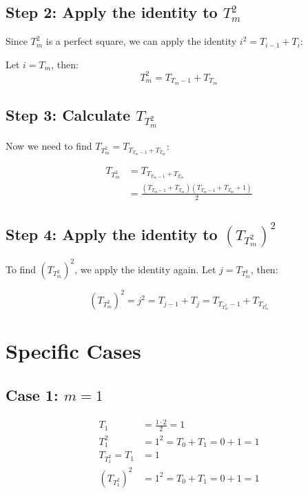 \documentclass{article}
\begin{document}
\subsection{Step 2: Apply the identity to $T_m^2$}

Since $T_m^2$ is a perfect square, we can apply the identity $i^2 = T_{i-1} + T_i$:

Let $i = T_m$, then:
\begin{equation}
T_m^2 = T_{T_m-1} + T_{T_m}
\end{equation}

\subsection{Step 3: Calculate $T_{T_m^2}$}

Now we need to find $T_{T_m^2} = T_{T_{T_m-1} + T_{T_m}}$:

\begin{align}
T_{T_m^2} &= T_{T_{T_m-1} + T_{T_m}} \\
&= \frac{(T_{T_m-1} + T_{T_m})(T_{T_m-1} + T_{T_m} + 1)}{2}
\end{align}

\subsection{Step 4: Apply the identity to $(T_{T_m^2})^2$}

To find $(T_{T_m^2})^2$, we apply the identity again. Let $j = T_{T_m^2}$, then:

\begin{equation}
(T_{T_m^2})^2 = j^2 = T_{j-1} + T_j = T_{T_{T_m^2}-1} + T_{T_{T_m^2}}
\end{equation}

\section{Specific Cases}

\subsection{Case 1: $m = 1$}

\begin{align}
T_1 &= \frac{1 \cdot 2}{2} = 1 \\
T_1^2 &= 1^2 = T_0 + T_1 = 0 + 1 = 1 \\
T_{T_1^2} = T_1 &= 1 \\
(T_{T_1^2})^2 &= 1^2 = T_0 + T_1 = 0 + 1 = 1
\end{align}
\end{document}
